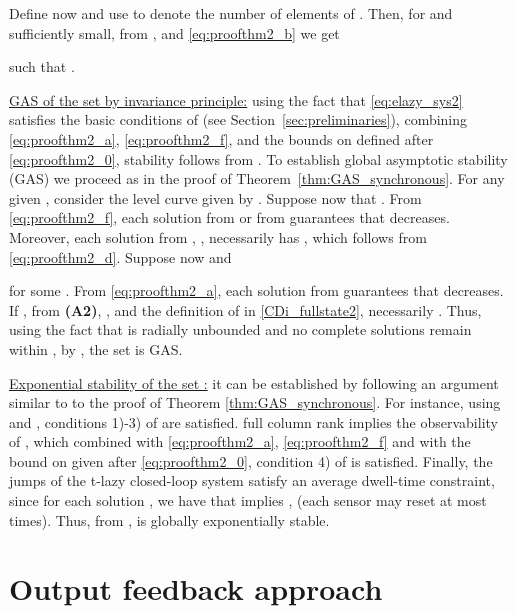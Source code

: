 \documentclass[twocolumn]{autart}
\begin{document}
Define now 
and use  to denote the number of elements of 
.
Then, for  and  sufficiently small,  
from ,  and \eqref{eq:proofthm2_b} we get 

 such that 
.

{ \underline{GAS of the set  by invariance principle:}}
using the fact that \eqref{eq:elazy_sys2} 
satisfies the basic conditions of \cite{GoebelCSM09} (see Section~\ref{sec:preliminaries}), 
combining \eqref{eq:proofthm2_a}, \eqref{eq:proofthm2_f}, and 
the bounds on  defined after 
\eqref{eq:proofthm2_0}, stability follows from \cite[Theorem 23]{GoebelCSM09}.
To establish global asymptotic stability (GAS) we proceed as 
in the proof of Theorem~\ref{thm:GAS_synchronous}.
For any given ,
consider the level curve given by 
.
Suppose now that . From
\eqref{eq:proofthm2_f}, 
each solution  from  or
from 
guarantees that  decreases. Moreover, each solution from 
, , 
 necessarily has , 
which follows from \eqref{eq:proofthm2_d}.
Suppose now  and 

for some .  
From \eqref{eq:proofthm2_a},
each solution  from 
 guarantees that  decreases. 
If , from \textbf{(A2)}, ,
and the definition of  in \eqref{CDi_fullstate2},
necessarily .
Thus, using the fact that  is radially unbounded and
no complete solutions remain within , 
by \cite[Theorem 23]{GoebelCSM09}, 
the set  is GAS.

{ \underline{Exponential stability of the set :}}
it can be 
established by following an argument similar to 
to the proof of Theorem \ref{thm:GAS_synchronous}.
For instance, using  and ,
conditions 1)-3) of \cite[Assumption 1]{TeelTAC13}
are satisfied.  full column rank implies the observability
of , which combined with
\eqref{eq:proofthm2_a}, \eqref{eq:proofthm2_f} and with the bound on
 given after \eqref{eq:proofthm2_0}, 
condition 4) of \cite[Assumption 1]{TeelTAC13} 
is satisfied. Finally, the jumps of the t-lazy closed-loop 
system satisfy an average dwell-time constraint, since 
for each solution , we have that
 implies ,
(each sensor may reset at most   times).
Thus, from \cite[Theorem 2]{TeelTAC13}, 
 is globally exponentially stable.
\hfill \hspace*{1pt} \hfill 












\section{Output feedback approach}
\label{sec:output_feedback}
\end{document}

